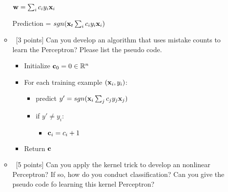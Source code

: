 \documentclass[12pt, fullpage,letterpaper]{article}
\begin{document}
\begin{enumerate}
\begin{itemize}
		${\bf w} = \sum_{i} c_i y_i {\bf x}_i$
		
		Prediction = $sgn({\bf x}_t \sum_{i} c_i y_i {\bf x}_i)$
		
		\bigbreak
		\bigbreak
		\bigbreak
		\bigbreak
		\bigbreak
		
		\item~[3 points] Can you develop an algorithm that uses mistake counts to learn the Perceptron? Please list the pseudo code. 
		
		\begin{itemize}
			\item Initialize ${\bf c}_0 = 0 \in \mathbb{R}^n$
			\item For each training example $({\bf x}_i, y_i)$:
			\begin{itemize}
				\item predict $y' = sgn({\bf x}_i \sum_{j} c_j y_j {\bf x}_j)$
				\item if $y' \ne y_i$:
					\begin{itemize}
						\item ${\bf c}_i = c_i + 1$
					\end{itemize}
			\end{itemize}
			\item Return ${\bf c}$
		\end{itemize}
		
		\item~[5 points] Can you apply the kernel trick to develop an nonlinear Perceptron? If so, how do you conduct classification? Can you give the pseudo code fo learning this kernel Perceptron? 
	\end{itemize}   
	
\end{enumerate}
\end{document}
